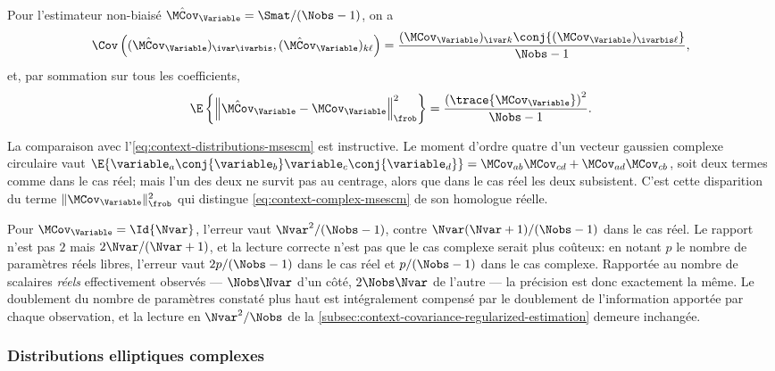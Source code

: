 \begin{proposition}
\label{prop:context-complex-msescm}
  Pour l'estimateur non-biaisé $\hat{\MCov}_\Variable = \Smat/(\Nobs-1)$, on a
  \begin{equation}
    \Cov\left(
      (\hat{\MCov}_\Variable)_{\ivar\ivarbis},
      (\hat{\MCov}_\Variable)_{k\ell}
    \right)
    =
    \frac{(\MCov_\Variable)_{\ivar k}\conj{(\MCov_\Variable)_{\ivarbis \ell}}}{\Nobs-1},
    \label{eq:context-complex-covscm}
  \end{equation}
  et, par sommation sur tous les coefficients,
  \begin{equation}
    \E\left\{\left\|\hat{\MCov}_\Variable-\MCov_\Variable\right\|_\frob^2\right\}
    =
    \frac{\left(\trace{\MCov_\Variable}\right)^2}{\Nobs-1}.
    \label{eq:context-complex-msescm}
  \end{equation}
\end{proposition}

\begin{remark}
  La comparaison avec l'\cref{eq:context-distributions-msescm} est instructive. Le moment d'ordre quatre d'un vecteur gaussien complexe circulaire vaut $\E\{\variable_a\conj{\variable_b}\variable_c\conj{\variable_d}\} = \MCov_{ab}\MCov_{cd} + \MCov_{ad}\MCov_{cb}$, soit deux termes comme dans le cas réel; mais l'un des deux ne survit pas au centrage, alors que dans le cas réel les deux subsistent. C'est cette disparition du terme $\|\MCov_\Variable\|_\frob^2$ qui distingue \cref{eq:context-complex-msescm} de son homologue réelle.

  Pour $\MCov_\Variable=\Id{\Nvar}$, l'erreur vaut $\Nvar^2/(\Nobs-1)$, contre $\Nvar(\Nvar+1)/(\Nobs-1)$ dans le cas réel. Le rapport n'est pas $2$ mais $2\Nvar/(\Nvar+1)$, et la lecture correcte n'est pas que le cas complexe serait plus coûteux: en notant $p$ le nombre de paramètres réels libres, l'erreur vaut $2p/(\Nobs-1)$ dans le cas réel et $p/(\Nobs-1)$ dans le cas complexe. Rapportée au nombre de scalaires \emph{réels} effectivement observés — $\Nobs\Nvar$ d'un côté, $2\Nobs\Nvar$ de l'autre — la précision est donc exactement la même. Le doublement du nombre de paramètres constaté plus haut est intégralement compensé par le doublement de l'information apportée par chaque observation, et la lecture en $\Nvar^2/\Nobs$ de la \cref{subsec:context-covariance-regularized-estimation} demeure inchangée.
\end{remark}

\subsubsection{Distributions elliptiques complexes}

